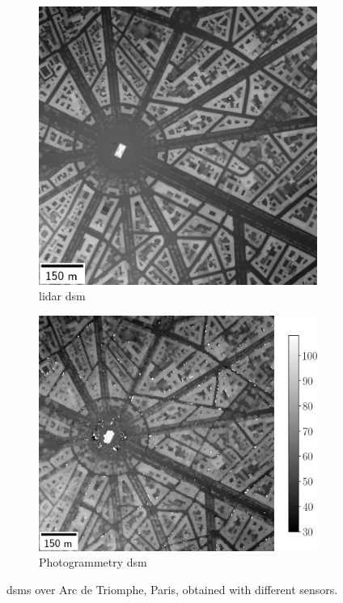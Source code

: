 \begin{figure}
\begin{subfigure}[t]{0.31\linewidth}
        \includegraphics[width=\linewidth]{Images/Chap_1/etoile_high_res_dsm.png}
        \caption{\acrshort{lidar} \acrshort{dsm}}
        \label{fig:etoile_lidar}
    \end{subfigure}\hfill
    \begin{subfigure}[t]{0.365\linewidth}
        \flushright
        \includegraphics[width=\linewidth]{Images/Chap_1/etoile_cars_dsm.png}
        \caption{Photogrammetry \acrshort{dsm}}
        \label{fig:etoile_photogrammetry}
    \end{subfigure}
    \caption{\acrshort{dsm}s over Arc de Triomphe, Paris, obtained with different sensors.}
    \label{fig:etoile}
\end{figure}

